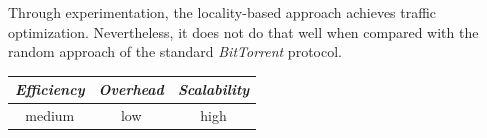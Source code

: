 Through experimentation, %
the locality-based approach achieves traffic optimization.
Nevertheless, it does not do that well when compared with the 
random approach of the standard {\sl BitTorrent} protocol.
\begin{center}
{\footnotesize
\begin{tabular}{ccc}
\emph{Efficiency} & \emph{Overhead} & \emph{Scalability} \\
\hline
medium &
low &
%
high
\end{tabular}
}
\end{center}

